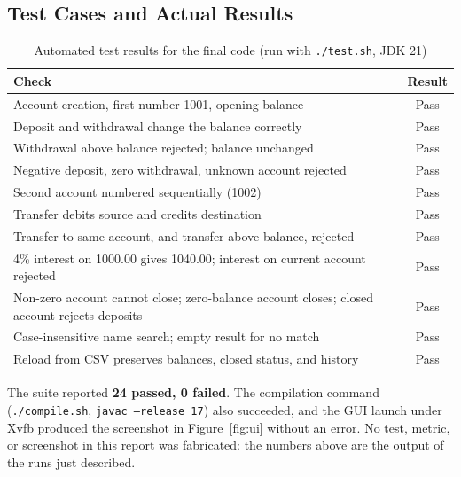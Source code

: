 \documentclass[11pt,a4paper]{report}
\begin{document}
\subsection{Test Cases and Actual Results}
\begin{table}[h]
    \centering
    \caption{Automated test results for the final code (run with \texttt{./test.sh}, JDK 21)}
    \begin{tabular}{p{8.5cm}c}
        \toprule
        \textbf{Check} & \textbf{Result} \\
        \midrule
        Account creation, first number 1001, opening balance & Pass \\
        Deposit and withdrawal change the balance correctly & Pass \\
        Withdrawal above balance rejected; balance unchanged & Pass \\
        Negative deposit, zero withdrawal, unknown account rejected & Pass \\
        Second account numbered sequentially (1002) & Pass \\
        Transfer debits source and credits destination & Pass \\
        Transfer to same account, and transfer above balance, rejected & Pass \\
        4\% interest on 1000.00 gives 1040.00; interest on current account rejected & Pass \\
        Non-zero account cannot close; zero-balance account closes; closed account rejects deposits & Pass \\
        Case-insensitive name search; empty result for no match & Pass \\
        Reload from CSV preserves balances, closed status, and history & Pass \\
        \bottomrule
    \end{tabular}
\end{table}

\noindent The suite reported \textbf{24 passed, 0 failed}. The compilation command (\texttt{./compile.sh}, \texttt{javac --release 17}) also succeeded, and the GUI launch under Xvfb produced the screenshot in Figure~\ref{fig:ui} without an error. No test, metric, or screenshot in this report was fabricated: the numbers above are the output of the runs just described.
\end{document}
